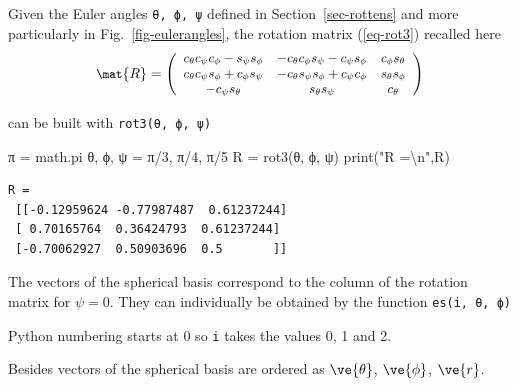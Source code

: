 \documentclass[
  letterpaper,
  DIV=11,
  numbers=noendperiod]{scrreprt}
\newenvironment{Shaded}{\begin{snugshade}}{\end{snugshade}}
\newcommand{\BuiltInTok}[1]{\textcolor[rgb]{0.00,0.23,0.31}{#1}}
\newcommand{\CharTok}[1]{\textcolor[rgb]{0.13,0.47,0.30}{#1}}
\newcommand{\DecValTok}[1]{\textcolor[rgb]{0.68,0.00,0.00}{#1}}
\newcommand{\NormalTok}[1]{\textcolor[rgb]{0.00,0.23,0.31}{#1}}
\newcommand{\OperatorTok}[1]{\textcolor[rgb]{0.37,0.37,0.37}{#1}}
\newcommand{\StringTok}[1]{\textcolor[rgb]{0.13,0.47,0.30}{#1}}
\begin{document}
Given the Euler angles \texttt{θ,\ ϕ,\ ψ} defined in
Section~\ref{sec-rottens} and more particularly in
Fig.~\ref{fig-eulerangles}, the rotation matrix (\ref{eq-rot3}) recalled
here \[
\small
\mat{R}=
   \left(
   \begin{array}{ccc}
   c_\theta  c_\psi  c_\phi - s_\psi  s_\phi & - c_\theta  c_\phi  s_\psi - c_\psi  s_\phi & c_\phi  s_\theta \\
   c_\theta  c_\psi  s_\phi + c_\phi  s_\psi & - c_\theta  s_\psi  s_\phi + c_\psi  c_\phi & s_\theta  s_\phi \\
   - c_\psi  s_\theta & s_\theta  s_\psi & c_\theta \\
   \end{array}
   \right) 
\]

can be built with \texttt{rot3(θ,\ ϕ,\ ψ)}

\begin{Shaded}
\begin{Highlighting}[]
\NormalTok{π }\OperatorTok{=}\NormalTok{ math.pi}
\NormalTok{θ, ϕ, ψ }\OperatorTok{=}\NormalTok{ π}\OperatorTok{/}\DecValTok{3}\NormalTok{, π}\OperatorTok{/}\DecValTok{4}\NormalTok{, π}\OperatorTok{/}\DecValTok{5}
\NormalTok{R }\OperatorTok{=}\NormalTok{ rot3(θ, ϕ, ψ)}
\BuiltInTok{print}\NormalTok{(}\StringTok{"R =}\CharTok{\textbackslash{}n}\StringTok{"}\NormalTok{,R)}
\end{Highlighting}
\end{Shaded}

\begin{verbatim}
R =
 [[-0.12959624 -0.77987487  0.61237244]
 [ 0.70165764  0.36424793  0.61237244]
 [-0.70062927  0.50903696  0.5       ]]
\end{verbatim}

The vectors of the spherical basis correspond to the column of the
rotation matrix for \(\psi=0\). They can individually be obtained by the
function \texttt{es(i,\ θ,\ ϕ)}

\begin{tcolorbox}[enhanced jigsaw, left=2mm, bottomrule=.15mm, colbacktitle=quarto-callout-warning-color!10!white, colback=white, colframe=quarto-callout-warning-color-frame, rightrule=.15mm, bottomtitle=1mm, toptitle=1mm, titlerule=0mm, title=\textcolor{quarto-callout-warning-color}{\faExclamationTriangle}\hspace{0.5em}{Warning}, toprule=.15mm, arc=.35mm, opacityback=0, opacitybacktitle=0.6, leftrule=.75mm, breakable, coltitle=black]

Python numbering starts at 0 so \texttt{i} takes the values 0, 1 and 2.

Besides vectors of the spherical basis are ordered as \(\ve{\theta}\),
\(\ve{\phi}\), \(\ve{r}\).

\end{tcolorbox}
\end{document}
